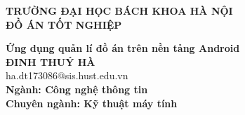 \documentclass[Main.tex]{subfiles}
\begin{document}
\begin{titlepage}
\thispagestyle{empty}
\begin{center}

{\textbf{\large{TRƯỜNG ĐẠI HỌC BÁCH KHOA HÀ NỘI }}}\\[4cm]

{\textbf{\huge{ĐỒ ÁN TỐT NGHIỆP}}}\\[1cm]
{\textbf{\Large{Ứng dụng quản lí đồ án trên nền tảng Android}}\\[1cm]

{\textbf{\large{ĐINH THUÝ HÀ}}}\\
{\large{ha.dt173086@sis.hust.edu.vn}}\\[0.5cm]

{\textbf{\large{Ngành: Công nghệ thông tin}}}\\
{\textbf{\large{Chuyên ngành: Kỹ thuật máy tính}}}\\

\vspace{2cm}
\begin{table}[H]
\centering
{}
\end{table}}
\end{center}



\end{titlepage}
\end{document}
